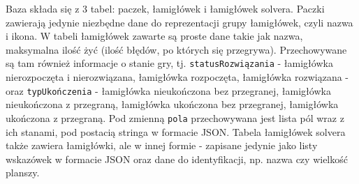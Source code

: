 	Baza składa się z 3 tabel: paczek, łamigłówek i łamigłówek solvera. Paczki zawierają jedynie
niezbędne dane do reprezentacji grupy łamigłówek, czyli nazwa i ikona. W tabeli łamigłówek zawarte
są proste dane takie jak nazwa, maksymalna ilość żyć (ilość błędów, po których się przegrywa).
Przechowywane są tam również informacje o stanie gry, tj. \texttt{statusRozwiązania} - łamigłówka
nierozpoczęta i nierozwiązana, łamigłówka rozpoczęta, łamigłówka rozwiązana - oraz \texttt{typUkończenia} -
łamigłówka nieukończona bez przegranej, łamigłówka nieukończona z przegraną, łamigłówka ukończona
bez przegranej, łamigłówka ukończona z przegraną. Pod zmienną \texttt{pola} przechowywana jest lista
pól wraz z ich stanami, pod postacią stringa w formacie JSON. Tabela łamigłówek solvera także zawiera
łamigłówki, ale w innej formie - zapisane jedynie jako listy wskazówek w formacie JSON oraz dane
do identyfikacji, np. nazwa czy wielkość planszy.
